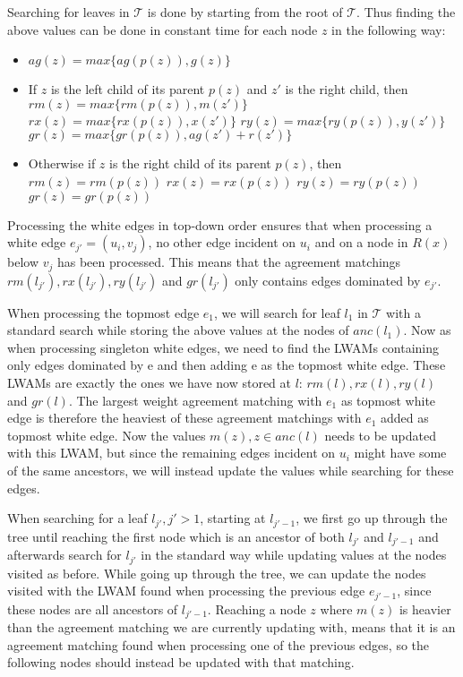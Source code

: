 Searching for leaves in $\mathcal{T}$ is done by starting from the root of $\mathcal{T}$. Thus finding the above values can be done in constant time for each node $z$ in the following way:
\begin{itemize}
	\item $ag(z) = max\{ag(p(z)), g(z)\}$
	\item If $z$ is the left child of its parent $p(z)$ and $z'$ is the right child, then
		\subitem $rm(z) = max\{rm(p(z)), m(z')\}$
		\subitem $rx(z) = max\{rx(p(z)), x(z')\}$
		\subitem $ry(z) = max\{ry(p(z)), y(z')\}$
		\subitem $gr(z) = max\{gr(p(z)), ag(z') + r(z')\}$
	\item Otherwise if $z$ is the right child of its parent $p(z)$, then
	\subitem $rm(z) = rm(p(z))$
	\subitem $rx(z) = rx(p(z))$
	\subitem $ry(z) = ry(p(z))$
	\subitem $gr(z) = gr(p(z))$
\end{itemize}

Processing the white edges in top-down order ensures that when processing a white edge $e_{j'}=(u_i,v_j)$, no other edge incident on $u_i$ and on a node in $R(x)$ below $v_j$ has been processed. This means that the agreement matchings $rm(l_{j'}), rx(l_{j'}), ry(l_{j'})$ and $gr(l_{j'})$ only contains edges dominated by $e_{j'}$.

When processing the topmost edge $e_1$, we will search for leaf $l_1$ in $\mathcal{T}$ with a standard search while storing the above values at the nodes of $anc(l_1)$. Now as when processing singleton white edges, we need to find the LWAMs containing only edges dominated by e and then adding e as the topmost white edge. These LWAMs are exactly the ones we have now stored at $l$: $rm(l), rx(l), ry(l)$ and $gr(l)$. The largest weight agreement matching with $e_1$ as topmost white edge is therefore the heaviest of these agreement matchings with $e_1$ added as topmost white edge. Now the values $m(z), z \in anc(l)$ needs to be updated with this LWAM, but since the remaining edges incident on $u_i$ might have some of the same ancestors, we will instead update the values while searching for these edges.

When searching for a leaf $l_{j'}, j' > 1$, starting at $l_{j'-1}$, we first go up through the tree until reaching the first node which is an ancestor of both $l_{j'}$ and $l_{j'-1}$ and afterwards search for $l_{j'}$ in the standard way while updating values at the nodes visited as before. While going up through the tree, we can update the nodes visited with the LWAM found when processing the previous edge $e_{j'-1}$, since these nodes are all ancestors of $l_{j'-1}$. Reaching a node $z$ where $m(z)$ is heavier than the agreement matching we are currently updating with, means that it is an agreement matching found when processing one of the previous edges, so the following nodes should instead be updated with that matching.

